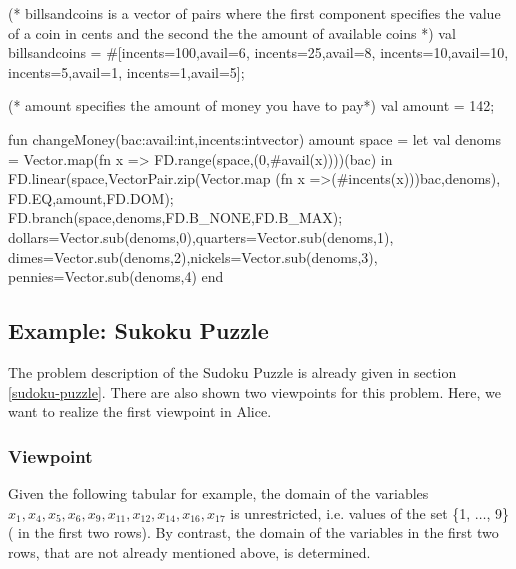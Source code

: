 \documentclass[a4paper]{scrartcl}
\begin{document}
\begin{myverbatim}
(* billsandcoins is a vector of pairs where the first component
   specifies the value of a coin in cents and the second the
   the amount of available coins *)
   val billsandcoins = #[{incents=100,avail=6},
                         {incents=25,avail=8},
                         {incents=10,avail=10},
                         {incents=5,avail=1},
                         {incents=1,avail=5}];
                         
(* amount specifies the amount of money you have to pay*)
   val amount = 142;


fun changeMoney(bac:{avail:int,incents:int}vector) amount space =
    let
       val denoms = Vector.map(fn x => 
                     FD.range(space,(0,#avail(x))))(bac)      
    in
       FD.linear(space,VectorPair.zip(Vector.map
                              (fn x =>(#incents(x)))bac,denoms),
                       FD.EQ,amount,FD.DOM);
       FD.branch(space,denoms,FD.B_NONE,FD.B_MAX);
      {dollars=Vector.sub(denoms,0),quarters=Vector.sub(denoms,1),
       dimes=Vector.sub(denoms,2),nickels=Vector.sub(denoms,3),
       pennies=Vector.sub(denoms,4)}
    end  
\end{myverbatim}


\newpage
\subsection{Example: Sukoku Puzzle}
\label{sudoku-puzzle2}
The problem description of the Sudoku Puzzle is already given
in section \ref{sudoku-puzzle}. There are also shown two viewpoints
for this problem. Here, we want to realize the first viewpoint in
Alice. 

\subsubsection{Viewpoint}

Given the following tabular for example, the domain
of the variables $x_1, x_4, x_5, x_6, x_9, x_{11}, 
x_{12}, x_{14}, x_{16}, x_{17}$ is unrestricted, i.e. 
values of the set \{1, $\ldots$, 9\} ( in
the first two rows).
By contrast, the domain of the variables in the first two rows,
that are not already mentioned above, is determined.
\end{document}
